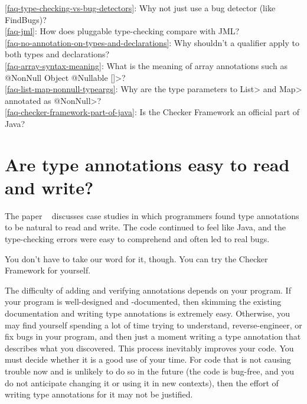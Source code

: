 \ref{faq-type-checking-vs-bug-detectors}: Why not just use a bug detector (like FindBugs)? \\
\ref{faq-jml}: How does pluggable type-checking compare with JML? \\
\ref{faq-no-annotation-on-types-and-declarations}: Why shouldn't a qualifier apply to both types and declarations? \\
\ref{faq-array-syntax-meaning}: What is the meaning of array annotations such as \<@NonNull Object @Nullable []>? \\
\ref{faq-list-map-nonnull-typeargs}: Why are the type parameters to \<List> and \<Map> annotated as \<@NonNull>? \\
\ref{faq-checker-framework-part-of-java}: Is the Checker Framework an official part of Java? \\



\section{Are type annotations easy to read and write?\label{faq-ease-of-use}}

The paper
~\cite{PapiACPE2008} discusses case studies in
which programmers
found type annotations to be natural to read and write.  The code
continued to feel like Java, and the type-checking errors were easy to
comprehend and often led to real bugs.

You don't have to take our word for it, though.  You can try the
Checker Framework for yourself.

The difficulty of adding and verifying annotations depends on your program.
If your program is well-designed and -documented, then skimming the
existing documentation and writing type annotations is extremely easy.
Otherwise, you may find yourself spending a lot of time trying to
understand, reverse-engineer, or fix bugs in your program, and then just a
moment writing a type annotation that describes what you discovered.  This
process inevitably improves your code.  You must decide whether it is a
good use of your time.  For code that is not causing trouble now and is
unlikely to do so in the future (the code is bug-free, and you do not
anticipate changing it or using it in new contexts), then the
effort of writing type annotations for it may not be justified.


